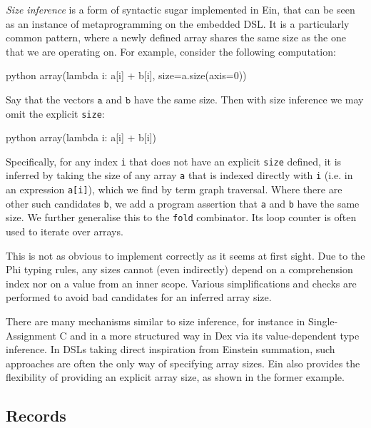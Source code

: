 \textit{Size inference} is a form of syntactic sugar implemented in Ein, that can be seen as an instance of metaprogramming on the embedded DSL. It is a particularly common pattern, where a newly defined array shares the same size as the one that we are operating on. For example, consider the following computation:
\begin{center} 
\begin{cminted}{python}
array(lambda i: a[i] + b[i], size=a.size(axis=0))
\end{cminted} 
\end{center}
Say that the vectors $\texttt{a}$ and $\texttt{b}$ have the same size. Then with size inference we may omit the explicit \texttt{size}:
\begin{center} 
\begin{cminted}{python}
array(lambda i: a[i] + b[i])
\end{cminted} 
\end{center}
Specifically, for any index \texttt{i} that does not have an explicit \texttt{size} defined, it is inferred by taking the size of any array \texttt{a} that is indexed directly with \texttt{i} (i.e. in an expression \texttt{a[i]}), which we find by term graph traversal. Where there are other such candidates \texttt{b}, we add a program assertion that \texttt{a} and \texttt{b} have the same size. We further generalise this to the \texttt{fold} combinator. Its loop counter is often used to iterate over arrays.

This is not as obvious to implement correctly as it seems at first sight. Due to the Phi typing rules, any sizes cannot (even indirectly) depend on a comprehension index nor on a value from an inner scope. Various simplifications and checks are performed to avoid bad candidates for an inferred array size.

There are many mechanisms similar to size inference, for instance in Single-Assignment C and in a more structured way in Dex via its value-dependent type inference. In DSLs taking direct inspiration from Einstein summation, such approaches are often the only way of specifying array sizes. Ein also provides the flexibility of providing an explicit array size, as shown in the former example.

\subsection{Records}

